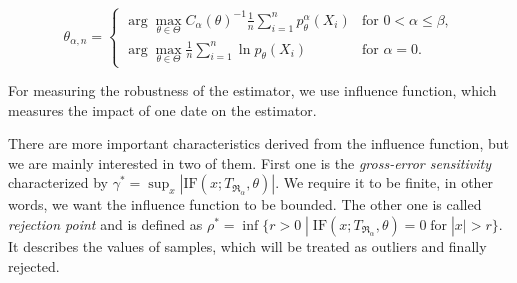 {\begin{equation}
	\theta_{\alpha,n} =
	\begin{cases}
		\displaystyle{ \arg \max_{\theta \in \Theta} C_\alpha\left( \theta \right)^{-1} \frac{1}{n} \sum_{i=1}^n p_{\theta}^{\alpha}\left( X_i \right) } & \text{for } 0 < \alpha \leq \beta, \\
		\displaystyle{ \arg \max_{\theta \in \Theta}  \frac{1}{n} \sum_{i=1}^n \ln p_{\theta}\left( X_i \right) } & \text{for } \alpha = 0.
	\end{cases}	
	\label{JK-Renyi-estimator_formula}
\end{equation}



%
%

For measuring the robustness of the estimator, we use influence function, which measures the impact of one date on the estimator. 

There are more important characteristics derived from the influence function, but we are mainly interested in two of them. First one is the {\em gross-error sensitivity} characterized by $\gamma^* = \sup_x |\mathrm{IF}(x;T_{\mathfrak{R}_\alpha},\theta)|$. We require it to be finite, in other words, we want the influence function to be bounded. The other one is called {\em rejection point} and is defined as
$\rho^* = \inf\lbrace  r > 0 \; | \; \mathrm{IF}(x;T_{\mathfrak{R}_\alpha},\theta) = 0 \; \mathrm{for} \; |x|> r \rbrace$. It describes the values of samples, which will be treated as outliers and finally rejected.
 
}
